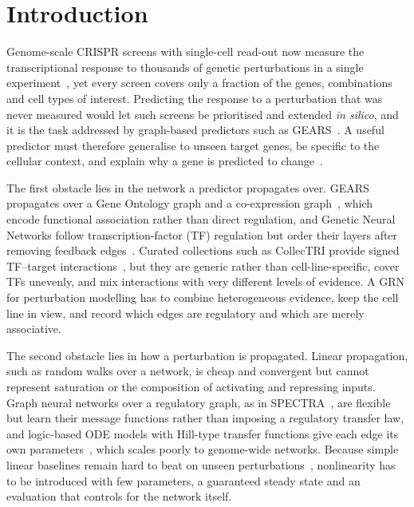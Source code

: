 \section{Introduction}
\label{sec:introduction}

Genome-scale CRISPR screens with single-cell read-out now measure the transcriptional response to thousands of genetic perturbations in a single experiment~\cite{replogle2022mapping}, yet every screen covers only a fraction of the genes, combinations and cell types of interest.
Predicting the response to a perturbation that was never measured would let such screens be prioritised and extended \emph{in silico}, and it is the task addressed by graph-based predictors such as GEARS~\cite{roohani2024predicting}.
A useful predictor must therefore generalise to unseen target genes, be specific to the cellular context, and explain why a gene is predicted to change~\cite{bunne2024build}.

The first obstacle lies in the network a predictor propagates over.
GEARS propagates over a Gene Ontology graph and a co-expression graph~\cite{roohani2024predicting}, which encode functional association rather than direct regulation, and Genetic Neural Networks follow transcription-factor (TF) regulation but order their layers after removing feedback edges~\cite{eetemadi2019genetic}.
Curated collections such as CollecTRI provide signed TF--target interactions~\cite{mullerdott2023collectri}, but they are generic rather than cell-line-specific, cover TFs unevenly, and mix interactions with very different levels of evidence.
A GRN for perturbation modelling has to combine heterogeneous evidence, keep the cell line in view, and record which edges are regulatory and which are merely associative.

The second obstacle lies in how a perturbation is propagated.
Linear propagation, such as random walks over a network, is cheap and convergent but cannot represent saturation or the composition of activating and repressing inputs.
Graph neural networks over a regulatory graph, as in SPECTRA~\cite{calabro2026spectra}, are flexible but learn their message functions rather than imposing a regulatory transfer law, and logic-based ODE models with Hill-type transfer functions give each edge its own parameters~\cite{eduati2017}, which scales poorly to genome-wide networks.
Because simple linear baselines remain hard to beat on unseen perturbations~\cite{ahlmanneltze2025comparison}, nonlinearity has to be introduced with few parameters, a guaranteed steady state and an evaluation that controls for the network itself.

